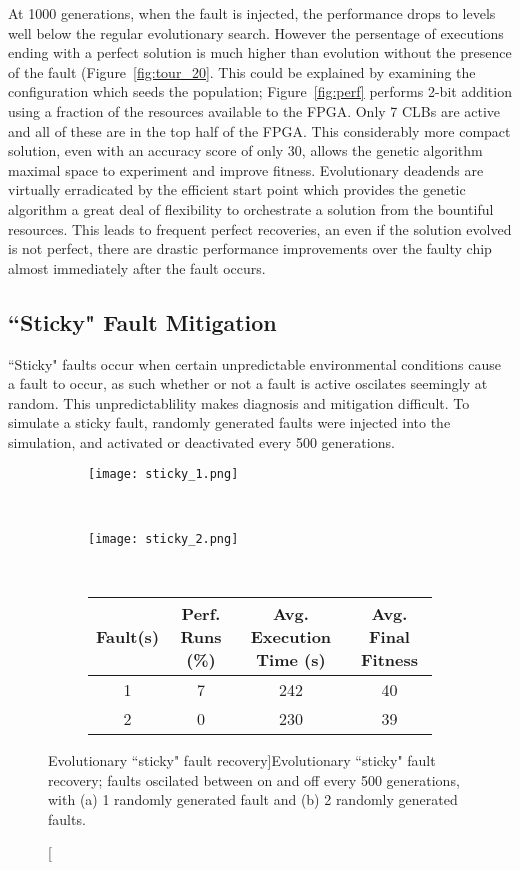 At 1000 generations, when the fault is injected, the performance drops to levels
well below the regular evolutionary search. However the persentage of executions
ending with a perfect solution is much higher than evolution without the presence
of the fault (Figure~\ref{fig:tour_20}. This could be explained by examining the configuration which seeds
the population; Figure~\ref{fig:perf} performs 2-bit addition using a fraction of the
resources available to the FPGA. Only 7 CLBs are active and all of these are in the top
half of the FPGA. This considerably more compact solution, even with an accuracy score
of only 30, allows the genetic algorithm maximal space to experiment and improve fitness.
Evolutionary deadends are virtually
erradicated by the efficient start point which provides the genetic algorithm a great
deal of flexibility to orchestrate a solution from the bountiful resources.
This leads to frequent perfect recoveries, an even if the solution evolved is not perfect,
there are drastic performance improvements over the faulty chip almost immediately after
the fault occurs.

\subsection{``Sticky" Fault Mitigation}
``Sticky" faults occur when certain unpredictable environmental conditions cause
a fault to occur, as such whether or not a fault is active oscilates seemingly at
random. This unpredictablility makes diagnosis and mitigation difficult.
To simulate a sticky fault, randomly generated faults were injected into the simulation,
and activated
or deactivated every 500 generations. 

\begin{figure}
	\centering
	\begin{subfigure}[ht]{0.49\textwidth}
		\texttt{[image: sticky\_1.png]}
		\caption{}
		\vspace{1em}
	\end{subfigure}
	~
	\begin{subfigure}[ht]{0.49\textwidth}
		\texttt{[image: sticky\_2.png]}
		\caption{}
		\vspace{1em}
	\end{subfigure}
	~
	\begin{subfigure}[ht]{\textwidth}
		\centering
		\begin{tabular}{cccc}
			\toprule
			\bfseries{Fault(s)} & \bfseries{Perf. Runs (\%)} &
			\bfseries{Avg. Execution Time (s)} & \bfseries{Avg. Final Fitness}\\
			\midrule
			1 & 7 & 242 & 40 \\
			2 & 0 & 230 & 39 \\
			\bottomrule
		\end{tabular}
	\end{subfigure}
	\caption[Evolutionary ``sticky" fault recovery]{Evolutionary ``sticky"
		fault recovery; faults oscilated between on and off every 500
		generations, with
		(a) 1 randomly generated fault and (b) 2 randomly generated
	faults.}
	\label{fig:sticky}
\end{figure}

